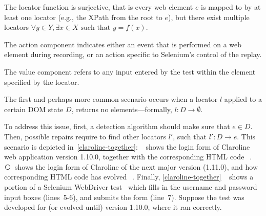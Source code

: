The locator function is surjective, that is every web element $e$ is mapped to by at least one locator (e.g., the XPath from the root to $e$), but there exist multiple locators {$\displaystyle \forall y\in Y,\exists x\in X{\text{ such that }}y=f(x).$} 

\begin{defn}
The action component indicates either an event that is performed
on a web element during recording, or an action specific to Selenium's control of the replay.
\end{defn}

\begin{defn} The value component refers to any input entered by the test within the element specified by the locator.
\end{defn}

The first and perhaps more common scenario occurs when a locator $l$ applied to a certain DOM state $D$, returns no elements---formally, $l: D \rightarrow \emptyset$. 

To address this issue, first, a detection algorithm should make sure that $e \in D$. Then,  possible repairs require to find other locators $l'$, such that $l': D \rightarrow e$.
This scenario is depicted in~\autoref{claroline-together}: \textcircled{}~shows the login form of Claroline web application version 1.10.0, together with the corresponding HTML code~\textcircled{}. \textcircled{}~shows the login form of Claroline of the next major version (1.11.0), and how corresponding HTML code has evolved~\textcircled{}. 
Finally, \autoref{claroline-together}~\textcircled{} shows a portion of a Selenium WebDriver test~\cite{selenium} which 
fills in the username and password input boxes (lines~5-6), and submits the form (line~7). Suppose the test was developed for (or evolved until) version 1.10.0, where it ran correctly.

